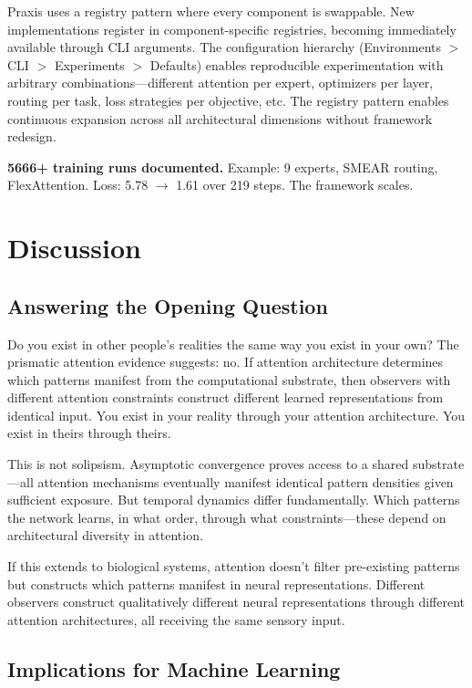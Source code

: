 \documentclass{article}
\begin{document}
Praxis uses a registry pattern where every component is swappable. New implementations register in component-specific registries, becoming immediately available through CLI arguments. The configuration hierarchy (Environments $>$ CLI $>$ Experiments $>$ Defaults) enables reproducible experimentation with arbitrary combinations—different attention per expert, optimizers per layer, routing per task, loss strategies per objective, etc. The registry pattern enables continuous expansion across all architectural dimensions without framework redesign.

\textbf{5666+ training runs documented.} Example: 9 experts, SMEAR routing, FlexAttention. Loss: 5.78 $\rightarrow$ 1.61 over 219 steps. The framework scales.

\section{Discussion}

\subsection{Answering the Opening Question}

Do you exist in other people's realities the same way you exist in your own? The prismatic attention evidence suggests: no. If attention architecture determines which patterns manifest from the computational substrate, then observers with different attention constraints construct different learned representations from identical input. You exist in your reality through your attention architecture. You exist in theirs through theirs.

This is not solipsism. Asymptotic convergence proves access to a shared substrate—all attention mechanisms eventually manifest identical pattern densities given sufficient exposure. But temporal dynamics differ fundamentally. Which patterns the network learns, in what order, through what constraints—these depend on architectural diversity in attention.

If this extends to biological systems, attention doesn't filter pre-existing patterns but constructs which patterns manifest in neural representations. Different observers construct qualitatively different neural representations through different attention architectures, all receiving the same sensory input.

\subsection{Implications for Machine Learning}
\end{document}
